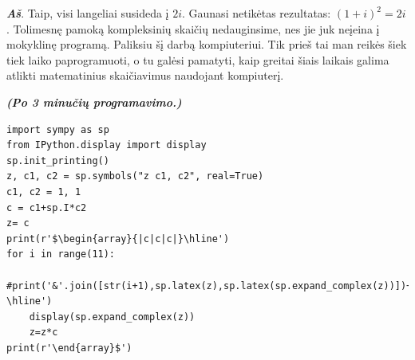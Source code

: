 \documentclass[a4paper]{article}
\newcommand{\say}[1]{\textbf{\textit{#1}}}
\begin{document}
\say{Aš}. Taip, visi langeliai susideda į $2i$. Gaunasi netikėtas rezultatas: $(1+i)^2=2i$. Tolimesnę pamoką kompleksinių skaičių nedauginsime, nes jie juk neįeina į mokyklinę programą. Paliksiu šį darbą kompiuteriui. Tik prieš tai man reikės šiek tiek laiko paprogramuoti, o tu galėsi pamatyti, kaip greitai šiais laikais galima atlikti matematinius skaičiavimus naudojant kompiuterį.

\say{(Po 3 minučių programavimo.)}

\begin{verbatim}
import sympy as sp
from IPython.display import display
sp.init_printing()
z, c1, c2 = sp.symbols("z c1, c2", real=True)  
c1, c2 = 1, 1
c = c1+sp.I*c2
z= c
print(r'$\begin{array}{|c|c|c|}\hline')
for i in range(11):
    #print('&'.join([str(i+1),sp.latex(z),sp.latex(sp.expand_complex(z))])+r'\\ \hline')
    display(sp.expand_complex(z))
    z=z*c
print(r'\end{array}$')
\end{verbatim}
\end{document}
